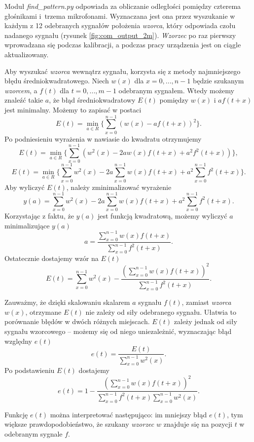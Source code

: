 Moduł \textit{find\_pattern.py} odpowiada za obliczanie odległości pomiędzy czterema głośnikami i~trzema mikrofonami.
Wyznaczana jest ona przez wyszukanie w każdym z 12 odebranych sygnałów  położenia \textit{wzorca}, który 
odpowiada czołu nadanego sygnału (rysunek \ref{fig:com_output_2m}).
\textit{Wzorzec} po raz pierwszy wprowadzana się podczas kalibracji, a  
podczas pracy urządzenia jest on ciągle aktualizowany.

Aby wyszukać \textit{wzorca} wewnątrz sygnału, korzysta się z  metody najmniejszego błędu średniokwadratowego.
Niech $w(x)$  dla $x = 0, ..., n-1$ będzie szukanym \textit{wzorcem}, a $f(t)$ dla $t = 0, ..., m-1$ odebranym sygnałem.
Wtedy możemy znaleźć takie $a$, że błąd średniokwadratowy $E(t)$ pomiędzy $w(x)$ i $a f(t+x)$ jest minimalny.
Możemy to zapisać w postaci
\[
  E(t) = \min_{a \in R} \{ \sum_{x=0}^{n-1}  \left( w(x) - a f(t+x) \right) ^2 \}.
\]
Po podniesieniu wyrażenia w nawiasie do kwadratu otrzymujemy
\[
  E(t) = \min_{a \in R} \{ \sum_{x=0}^{n-1}  \left( w^2(x) -2a w(x) f(t+x) + a^2 f^2(t+x) \right) \},
\]
\[
  E(t) = \min_{a \in R} \{ \sum_{x=0}^{n-1}  w^2(x) -2a \sum_{x=0}^{n-1}  w(x) f(t+x) + a^2 \sum_{x=0}^{n-1} f^2(t+x) \}.
\]
Aby wyliczyć $E(t)$, należy zminimalizować wyrażenie
\[
  y(a) = \sum_{x=0}^{n-1}  w^2(x) -2a \sum_{x=0}^{n-1}  w(x) f(t+x) + a^2 \sum_{x=0}^{n-1} f^2(t+x).
\]
Korzystając z faktu, że $y(a)$ jest funkcją kwadratową, możemy wyliczyć $a$ minimalizujące $y(a)$
\[
  a = \frac{ \sum\limits_{x=0}^{n-1}  w(x) f(t+x) }{ \sum\limits_{x=0}^{n-1} f^2(t+x) }.
\]
Ostatecznie dostajemy wzór na $E(t)$
\[
  E(t) = \sum_{x=0}^{n-1}  w^2(x)  - \frac {\left(\sum\limits_{x=0}^{n-1}  w(x) f(t+x) \right)^2 } { \sum\limits_{x=0}^{n-1} f^2(t+x)}.
\]

Zauważmy, że dzięki skalowaniu skalarem $a$  sygnału $f(t)$, zamiast \textit{wzorca} $w(x)$,
otrzymane $E(t)$ nie zależy od siły odebranego sygnału. Ułatwia to porównanie błędów w dwóch różnych miejscach.
$E(t)$ zależy jednak od siły sygnału wzorcowego -- możemy się od niego  uniezależnić, wyznaczając
błąd względny $e(t)$
\[
  e(t) = \frac{E(t)}{\sum\limits_{x=0}^{n-1}  w^2(x)}.
\]
Po podstawieniu $E(t)$ dostajemy
\[
  e(t) = 1 - \frac {\left(\sum\limits_{x=0}^{n-1}  w(x) f(t+x) \right)^2 } { \sum\limits_{x=0}^{n-1} f^2(t+x) \sum\limits_{x=0}^{n-1}  w^2(x)}.
\]
 
 Funkcję $e(t)$  można interpretować następująco:
 im mniejszy błąd $e(t)$, tym większe prawdopodobieństwo, że szukany \textit{wzorzec} $w$ znajduje się na pozycji $t$ w 
 odebranym sygnale $f$. 

